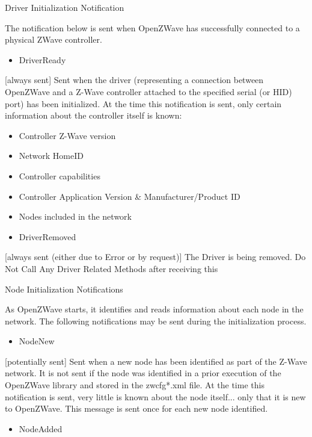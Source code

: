 \documentclass[letterpaper,10pt,english]{sphinxmanual}
\begin{document}
\begin{fulllineitems}
Driver Initialization Notification

The notification below is sent when OpenZWave has successfully connected
to a physical ZWave controller.
\begin{itemize}
\item {} 
DriverReady

\end{itemize}

{[}always sent{]}   Sent when the driver (representing a connection between OpenZWave
and a Z-Wave controller attached to the specified serial (or HID) port) has been initialized.
At the time this notification is sent, only certain information about the controller itself is known:
\begin{itemize}
\item {} 
Controller Z-Wave version

\item {} 
Network HomeID

\item {} 
Controller capabilities

\item {} 
Controller Application Version \& Manufacturer/Product ID

\item {} 
Nodes included in the network

\end{itemize}
\begin{itemize}
\item {} 
DriverRemoved

\end{itemize}

{[}always sent (either due to Error or by request){]} The Driver is being removed.
Do Not Call Any Driver Related Methods after receiving this

Node Initialization Notifications

As OpenZWave starts, it identifies and reads information about each node in the network.
The following notifications may be sent during the initialization process.
\begin{itemize}
\item {} 
NodeNew

\end{itemize}

{[}potentially sent{]}  Sent when a new node has been identified as part of the Z-Wave network.
It is not sent if the node was identified in a prior execution of the OpenZWave library
and stored in the zwcfg*.xml file.
At the time this notification is sent, very little is known about the node itself...
only that it is new to OpenZWave. This message is sent once for each new node identified.
\begin{itemize}
\item {} 
NodeAdded


\end{itemize}
\end{fulllineitems}
\end{document}
